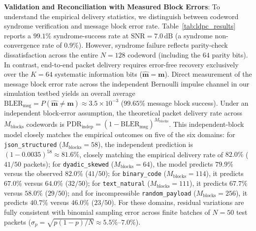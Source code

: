 \documentclass[conference]{IEEEtran}
\begin{document}
\textbf{Validation and Reconciliation with Measured Block Errors}: To understand the empirical delivery statistics, we distinguish between codeword syndrome verification and message block error rate. Table~\ref{tab:ldpc_results} reports a $99.1\%$ syndrome-success rate at $\text{SNR} = 7.0\,\text{dB}$ (a syndrome non-convergence rate of $0.9\%$). However, syndrome failure reflects parity-check dissatisfaction across the entire $N=128$ codeword (including the $64$ parity bits). In contrast, end-to-end packet delivery requires error-free recovery exclusively over the $K=64$ systematic information bits ($\hat{\mathbf{m}} = \mathbf{m}$). Direct measurement of the message block error rate across the independent Bernoulli impulse channel in our simulation testbed yields an overall average $\text{BLER}_{\text{msg}} = P(\hat{\mathbf{m}} \ne \mathbf{m}) \approx 3.5 \times 10^{-3}$ ($99.65\%$ message block success). Under an independent block-error assumption, the theoretical packet delivery rate across $M_{\text{blocks}}$ codewords is $\text{PDR}_{\text{indep}} = (1 - \text{BLER}_{\text{msg}})^{M_{\text{blocks}}}$. This independent-block model closely matches the empirical outcomes on five of the six domains: for \texttt{json\_structured} ($M_{\text{blocks}} = 58$), the independent prediction is $(1 - 0.0035)^{58} \approx 81.6\%$, closely matching the empirical delivery rate of $\mathbf{82.0\%}$ ($41/50$ packets); for \texttt{dyadic\_skewed} ($M_{\text{blocks}} = 64$), the model predicts $79.9\%$ versus the observed $\mathbf{82.0\%}$ ($41/50$); for \texttt{binary\_code} ($M_{\text{blocks}} = 114$), it predicts $67.0\%$ versus $\mathbf{64.0\%}$ ($32/50$); for \texttt{text\_natural} ($M_{\text{blocks}} = 111$), it predicts $67.7\%$ versus $\mathbf{58.0\%}$ ($29/50$); and for incompressible \texttt{random\_payload} ($M_{\text{blocks}} = 256$), it predicts $40.7\%$ versus $\mathbf{46.0\%}$ ($23/50$). For these domains, residual variations are fully consistent with binomial sampling error across finite batches of $N=50$ test packets ($\sigma_p = \sqrt{p(1-p)/N} \approx 5.5\%$--$7.0\%$).
\end{document}
